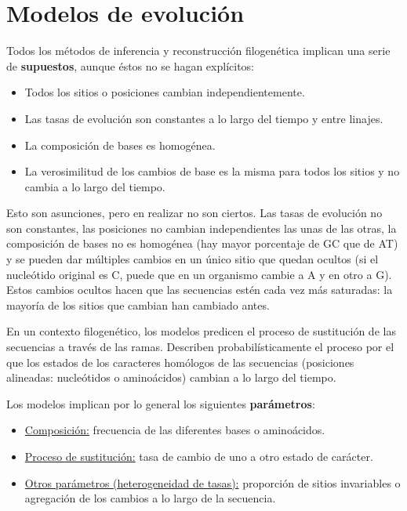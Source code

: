 \chapter{Modelos de evolución}
Todos los métodos de inferencia y reconstrucción filogenética implican una serie de \textbf{supuestos}, aunque éstos no se hagan explícitos: \begin{itemize}
\item Todos los sitios o posiciones cambian independientemente. 
\item Las tasas de evolución son constantes a lo largo del tiempo y entre linajes.
\item La composición de bases es homogénea.
\item La verosimilitud de los cambios de base es la misma para todos los sitios y no cambia a lo largo del tiempo. 
\end{itemize}

Esto son asunciones, pero en realizar no son ciertos. Las tasas de evolución no son constantes, las posiciones no cambian independientes las unas de las otras, la composición de bases no es homogénea (hay mayor porcentaje de GC que de AT) y se pueden dar múltiples cambios en un único sitio que quedan ocultos (si el nucleótido original es C, puede que en un organismo cambie a A y en otro a G). Estos cambios ocultos hacen que las secuencias estén cada vez más saturadas: la mayoría de los sitios que cambian han cambiado antes. 

En un contexto filogenético, los modelos predicen el proceso de sustitución de las secuencias a través de las ramas. Describen probabilísticamente el proceso por el que los estados de los caracteres homólogos de las secuencias (posiciones alineadas: nucleótidos o aminoácidos) cambian a lo largo del tiempo.

Los modelos implican por lo general los siguientes \textbf{parámetros}: \begin{itemize}
\item \underline{Composición:} frecuencia de las diferentes bases o aminoácidos.
\item \underline{Proceso de sustitución:} tasa de cambio de uno a otro estado de carácter.
\item \underline{Otros parámetros (heterogeneidad de tasas):} proporción de sitios invariables o agregación de los cambios a lo largo de la secuencia.
\end{itemize}

